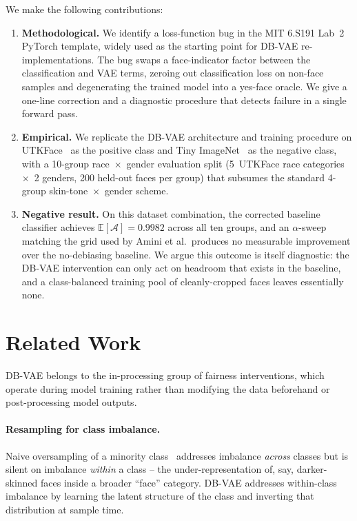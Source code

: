 \documentclass[10pt,twocolumn]{article}
\begin{document}
We make the following contributions:
\begin{enumerate}
    \item \textbf{Methodological.} We identify a loss-function bug in the
    MIT 6.S191 Lab~2 PyTorch template, widely used as the starting point
    for DB-VAE re-implementations. The bug swaps a face-indicator factor
    between the classification and VAE terms, zeroing out classification
    loss on non-face samples and degenerating the trained model into a
    yes-face oracle. We give a one-line correction and a diagnostic
    procedure that detects failure in a single forward pass.
    \item \textbf{Empirical.} We replicate the DB-VAE architecture and
    training procedure on UTKFace~\cite{zhang2017utkface} as the positive
    class and Tiny ImageNet~\cite{le2015tinyimagenet} as the negative
    class, with a 10-group race~$\times$~gender evaluation split
    (5~UTKFace race categories~$\times$~2 genders, 200 held-out faces per
    group) that subsumes the standard 4-group skin-tone~$\times$~gender
    scheme.
    \item \textbf{Negative result.} On this dataset combination, the
    corrected baseline classifier achieves $\mathbb{E}[\mathcal{A}] =
    0.9982$ across all ten groups, and an $\alpha$-sweep matching the
    grid used by Amini et al.\ produces no measurable improvement over
    the no-debiasing baseline. We argue this outcome is itself diagnostic:
    the DB-VAE intervention can only act on headroom that exists in the
    baseline, and a class-balanced training pool of cleanly-cropped faces
    leaves essentially none.
\end{enumerate}

\section{Related Work}

DB-VAE belongs to the in-processing group of fairness interventions, which operate during model training rather than modifying the data beforehand or post-processing model outputs.

\paragraph{Resampling for class imbalance.}
Naive oversampling of a minority class~\cite{more2016survey} addresses imbalance \emph{across} classes but is silent on imbalance \emph{within} a class -- the under-representation of, say, darker-skinned faces inside a broader ``face'' category. DB-VAE addresses within-class imbalance by learning the latent structure of the class and inverting that distribution at sample time.
\end{document}
